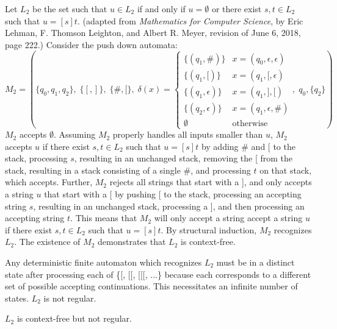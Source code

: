 \documentclass[12pt]{article}
\begin{document}
Let $L_2$ be the set such that $u\in L_2$ if and only if $u=\emptyset$ or there exist $s,t\in L_2$ such that $u=[s]t$. (adapted from \textit{Mathematics for Computer Science}, by Eric Lehman, F. Thomson Leighton, and Albert R. Meyer, revision of June 6, 2018, page 222.) Consider the push down automata:
$$M_2 = (\{q_0,q_1,q_2\},\;  \{[,]\},\;  \{\#,[\},\;  \delta(x)=\begin{cases}
\{(q_1,\#)\}                & x=(q_0,\epsilon,\epsilon)\\
\{(q_1,[)\}                 & x=(q_1,[,\epsilon)\\
\{(q_1,\epsilon)\}          & x=(q_1,],[)\\
\{(q_2,\epsilon)\} & x=(q_1,\epsilon,\#)\\
\emptyset                   & \textrm{otherwise}
\end{cases},\;  q_0, \{q_2\})$$
$M_2$ accepts $\emptyset$. Assuming $M_2$ properly handles all inputs smaller than $u$, $M_2$ accepts $u$ if there exist $s,t\in L_2$ such that $u=[s]t$ by adding \# and [ to the stack, processing $s$, resulting in an unchanged stack, removing the [ from the stack, resulting in a stack consisting of a single \#, and processing $t$ on that stack, which accepts. Further, $M_2$ rejects all strings that start with a ], and only accepts a string $u$ that start with a [ by pushing [ to the stack, processing an accepting string $s$, resulting in an unchanged stack, processing a ], and then processing an accepting string $t$. This means that $M_2$ will only accept a string accept a string $u$ if there exist $s,t\in L_2$ such that $u=[s]t$. By structural induction, $M_2$ recognizes $L_2$. The existence of $M_2$ demonstrates that $L_2$ is context-free.

Any deterministic finite automaton which recognizes $L_2$ must be in a distinct state after processing each of \{[, [[, [[[, ...\} because each corresponds to a different set of possible accepting continuations. This necessitates an infinite number of states. $L_2$ is not regular.

$L_2$ is context-free but not regular.
\end{document}
